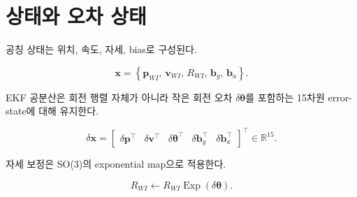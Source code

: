 \documentclass[11pt,a4paper,oneside]{report}
\begin{document}
\section{상태와 오차 상태}

공칭 상태는 위치, 속도, 자세, bias로 구성된다.

\begin{equation}
\mathbf{x}
= \left\{
\mathbf{p}_{WI},\,
\mathbf{v}_{WI},\,
R_{WI},\,
\mathbf{b}_g,\,
\mathbf{b}_a
\right\}.
\end{equation}

EKF 공분산은 회전 행렬 자체가 아니라 작은 회전 오차 \(\delta\boldsymbol{\theta}\)를
포함하는 15차원 error-state에 대해 유지한다.

\begin{equation}
\delta\mathbf{x}
=
\begin{bmatrix}
\delta\mathbf{p}^{\top} &
\delta\mathbf{v}^{\top} &
\delta\boldsymbol{\theta}^{\top} &
\delta\mathbf{b}_g^{\top} &
\delta\mathbf{b}_a^{\top}
\end{bmatrix}^{\top}
\in \mathbb{R}^{15}.
\end{equation}

자세 보정은 SO(3)의 exponential map으로 적용한다.

\begin{equation}
R_{WI} \leftarrow R_{WI}\operatorname{Exp}(\delta\boldsymbol{\theta}).
\end{equation}
\end{document}
